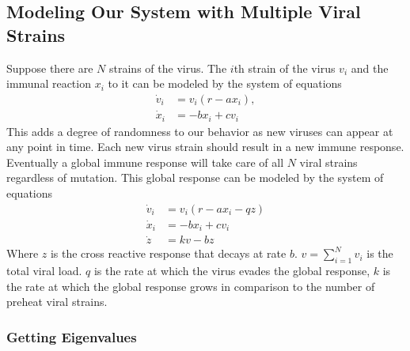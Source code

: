 \documentclass{article}
\begin{document}
\subsection{Modeling Our System with Multiple Viral Strains}
Suppose there are $N$ strains of the virus.  The $i$th strain of the virus $v_i$ and the immunal reaction $x_i$ to it can be modeled by the system of equations
\begin{equation}
    \begin{split}
        \dot v_i &= v_i(r - ax_i), \\
        \dot x_i &= -bx_i + cv_i
    \end{split}
\end{equation}
This adds a degree of randomness to our behavior as new viruses can appear at any point in time. Each new virus strain should result in a new immune response. Eventually a global immune response will take care of all $N$ viral strains regardless of mutation. This global response can be modeled by the system of equations
\begin{equation}
    \begin{split}
        \dot v_i &= v_i(r - ax_i - qz) \\
        \dot x_i &= -bx_i + cv_i \\
        \dot z &= kv - bz
    \end{split}
\end{equation}
Where $z$ is the cross reactive response that decays at rate $b$.  $v = \sum^{N}_{i=1} v_i$ is the total viral load. $q$ is the rate at which the virus evades the global response, $k$ is the rate at which the global response grows in comparison to the number of preheat viral strains.

\subsubsection{Getting Eigenvalues}
\end{document}
